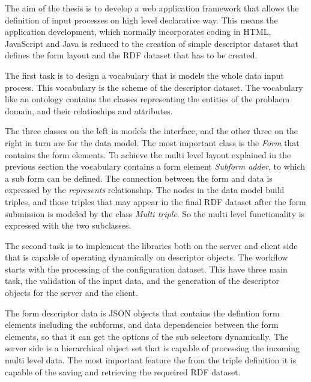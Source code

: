 The aim of the thesis is to develop a web application framework that allows the definition of input processes on high level declarative way. This means the application development, which normally incorporates coding in HTML, JavaScript and Java is reduced to the creation of simple descriptor dataset that defines the form layout and the RDF dataset that has to be created.

The first task is to design a vocabulary that is models the whole data input process. This vocabulary is the scheme of the descriptor dataset. The vocabulary like an ontology contains the classes representing the entities of the problaem domain, and their relatioships and attributes.



The three classes on the left in  models the interface, and the other three on the right in turn are for the data model. The most important class is the \textit{Form} that contains the form elements. To achieve the multi level layout explained in the previous section the vocabulary contains a form element \textit{Subform adder}, to which a sub form can be defined. The connection between the form and data is expressed by the \textit{represents} relationship. The nodes in the data model build triples, and those triples that may appear in the final RDF dataset after the form submission is modeled by the class \textit{Multi triple}. So the multi level functionality is expressed with the two subclasses.

The second task is to implement the libraries both on the server and client side that is capable of operating dynamically on descriptor objects. The workflow starts with the processing of the configuration dataset. This have three main task, the validation of the input data, and the generation of the descriptor objects for the server and the client.


The form descriptor data is JSON objects that contains the defintion form elements including the subforms, and data dependencies between the form elements, so that it can get the options of the sub selectors dynamically. The server side is a hierarchical object set that is capable of processing the incoming multi level data. The most important feature the from the triple definition it is capable of the saving and retrieving the requeired RDF dataset.








